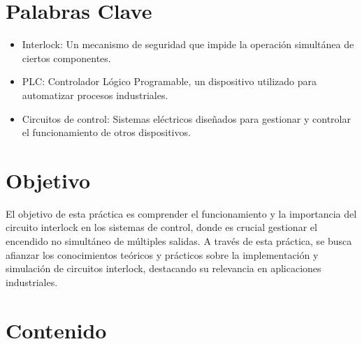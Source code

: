 \documentclass[12pt]{report}
\begin{document}
\tableofcontents
\newpage

\chapter*{Palabras Clave}
\begin{itemize}
   \item Interlock: Un mecanismo de seguridad que impide la operación simultánea de ciertos componentes.
   \item PLC: Controlador Lógico Programable, un dispositivo utilizado para automatizar procesos industriales.
   \item Circuitos de control: Sistemas eléctricos diseñados para gestionar y controlar el funcionamiento de otros dispositivos.
\end{itemize}

\newpage

\chapter*{Objetivo}
El objetivo de esta práctica es comprender el funcionamiento y la importancia del circuito interlock en los sistemas de control, donde es crucial gestionar el encendido no simultáneo de múltiples salidas. A través de esta práctica, se busca afianzar los conocimientos teóricos y prácticos sobre la implementación y simulación de circuitos interlock, destacando su relevancia en aplicaciones industriales.
\newpage

\chapter{Contenido}
\end{document}
